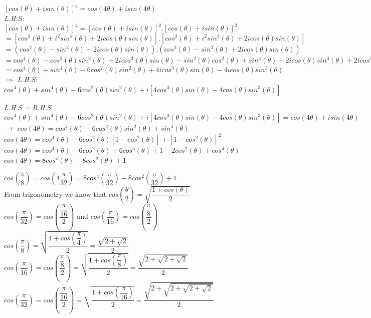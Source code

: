 \documentclass[fleqn]{article}
\begin{document}
\begin{enumerate}
    \textcolor{hwColor}{
      $[cos(\theta)+isin(\theta)]^4=cos(4\theta)+isin(4\theta)$ \\
      \emph{L.H.S:} \\ 
      $[cos(\theta)+isin(\theta)]^4=[cos(\theta)+isin(\theta)]^2.[cos(\theta)+isin(\theta)]^2$ \\
      $=[cos^2(\theta)+i^2sin^2(\theta)+2icos(\theta)sin(\theta)].[cos^2(\theta)+i^2sin^2(\theta)+2icos(\theta)sin(\theta)]$ \\
      $=(cos^2(\theta)-sin^2(\theta)+2icos(\theta)sin(\theta)).(cos^2(\theta)-sin^2(\theta)+2icos(\theta)sin(\theta))$ \\
      $=cos^4(\theta)-cos^2(\theta)sin^2(\theta)+2icos^3(\theta)sin(\theta)-sin^2(\theta)cos^2(\theta)+sin^4(\theta)-2icos(\theta)sin^3(\theta)+2icos^3(\theta)sin(\theta)-2icos(\theta)sin^3(\theta)-4cos^2(\theta)sin^2(\theta)$ \\
      $=cos^4(\theta)+sin^4(\theta)-6cos^2(\theta)sin^2(\theta)+4icos^3(\theta)sin(\theta)-4icos(\theta)sin^3(\theta)$ \\
      $\Longrightarrow$ \emph{L.H.S:} \\
      $cos^4(\theta)+sin^4(\theta)-6cos^2(\theta)sin^2(\theta)+i[4cos^3(\theta)sin(\theta)-4cos(\theta)sin^3(\theta)]$ 
    }

    \textcolor{hwColor}{
      \emph{L.H.S = R.H.S} \\
      $cos^4(\theta)+sin^4(\theta)-6cos^2(\theta)sin^2(\theta)+i[4cos^3(\theta)sin(\theta)-4cos(\theta)sin^3(\theta)]=cos(4\theta)+isin(4\theta)$ \\
      $\longrightarrow$ $cos(4\theta)=cos^4(\theta)-6cos^2(\theta)sin^2(\theta)+sin^4(\theta)$ \\
      $cos(4\theta)=cos^4(\theta)-6cos^2(\theta)[1-cos^2(\theta)]+[1-cos^2(\theta)]^2$ \\
      $cos(4\theta)=cos^4(\theta)-6cos^2(\theta)+6cos^4(\theta)+1-2cos^2(\theta)+cos^4(\theta)$ \\
      $cos(4\theta)=8cos^4(\theta)-8cos^2(\theta)+1$ \thinspace \thinspace \thinspace  $\boxed{}$ \\
    }

    \bigbreak

    \textcolor{hwColor}{
      $cos(\dfrac{\pi}{8})=cos(4\dfrac{\pi}{32})=8cos^4(\dfrac{\pi}{32})-8cos^2(\dfrac{\pi}{32})+1$ \\
      From trigonometry we know that $cos(\dfrac{\theta}{2})=\sqrt{\dfrac{1+cos(\theta)}{2}}$ \\
      $cos(\dfrac{\pi}{32})=cos(\dfrac{\dfrac{\pi}{16}}{2})$ and $cos(\dfrac{\pi}{16})=cos(\dfrac{\dfrac{\pi}{8}}{2})$ \\
      $cos(\dfrac{\pi}{8})=\sqrt{\dfrac{1+cos(\dfrac{\pi}{4})}{2}}=\dfrac{\sqrt{2+\sqrt{2}}}{2}$ \\
      $cos(\dfrac{\pi}{16})=cos(\dfrac{\dfrac{\pi}{8}}{2})=\sqrt{\dfrac{1+cos(\dfrac{\pi}{8})}{2}}=\dfrac{\sqrt{2+\sqrt{2+\sqrt{2}}}}{2}$ \\
      $cos(\dfrac{\pi}{32})=cos(\dfrac{\dfrac{\pi}{16}}{2})=\sqrt{\dfrac{1+cos(\dfrac{\pi}{16})}{2}}=\dfrac{\sqrt{2+\sqrt{2+\sqrt{2+\sqrt{2}}}}}{2}$ \\
    }


\end{enumerate}
\end{document}
